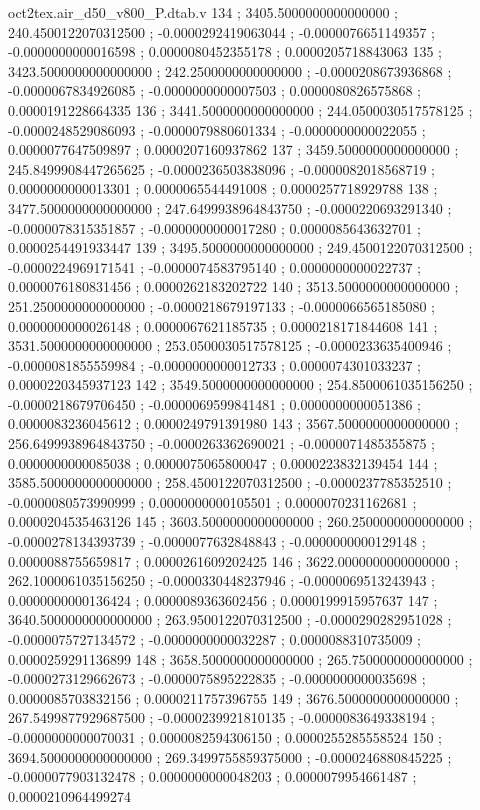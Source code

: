 \begin{filecontents}[overwrite]{oct2tex.air_d50_v800_P.dtab.v}
134 ; 3405.5000000000000000 ; 240.4500122070312500 ; -0.0000292419063044 ; -0.0000076651149357 ; -0.0000000000016598 ; 0.0000080452355178 ; 0.0000205718843063
135 ; 3423.5000000000000000 ; 242.2500000000000000 ; -0.0000208673936868 ; -0.0000067834926085 ; -0.0000000000007503 ; 0.0000080826575868 ; 0.0000191228664335
136 ; 3441.5000000000000000 ; 244.0500030517578125 ; -0.0000248529086093 ; -0.0000079880601334 ; -0.0000000000022055 ; 0.0000077647509897 ; 0.0000207160937862
137 ; 3459.5000000000000000 ; 245.8499908447265625 ; -0.0000236503838096 ; -0.0000082018568719 ; 0.0000000000013301 ; 0.0000065544491008 ; 0.0000257718929788
138 ; 3477.5000000000000000 ; 247.6499938964843750 ; -0.0000220693291340 ; -0.0000078315351857 ; -0.0000000000017280 ; 0.0000085643632701 ; 0.0000254491933447
139 ; 3495.5000000000000000 ; 249.4500122070312500 ; -0.0000224969171541 ; -0.0000074583795140 ; 0.0000000000022737 ; 0.0000076180831456 ; 0.0000262183202722
140 ; 3513.5000000000000000 ; 251.2500000000000000 ; -0.0000218679197133 ; -0.0000066565185080 ; 0.0000000000026148 ; 0.0000067621185735 ; 0.0000218171844608
141 ; 3531.5000000000000000 ; 253.0500030517578125 ; -0.0000233635400946 ; -0.0000081855559984 ; -0.0000000000012733 ; 0.0000074301033237 ; 0.0000220345937123
142 ; 3549.5000000000000000 ; 254.8500061035156250 ; -0.0000218679706450 ; -0.0000069599841481 ; 0.0000000000051386 ; 0.0000083236045612 ; 0.0000249791391980
143 ; 3567.5000000000000000 ; 256.6499938964843750 ; -0.0000263362690021 ; -0.0000071485355875 ; 0.0000000000085038 ; 0.0000075065800047 ; 0.0000223832139454
144 ; 3585.5000000000000000 ; 258.4500122070312500 ; -0.0000237785352510 ; -0.0000080573990999 ; 0.0000000000105501 ; 0.0000070231162681 ; 0.0000204535463126
145 ; 3603.5000000000000000 ; 260.2500000000000000 ; -0.0000278134393739 ; -0.0000077632848843 ; -0.0000000000129148 ; 0.0000088755659817 ; 0.0000261609202425
146 ; 3622.0000000000000000 ; 262.1000061035156250 ; -0.0000330448237946 ; -0.0000069513243943 ; 0.0000000000136424 ; 0.0000089363602456 ; 0.0000199915957637
147 ; 3640.5000000000000000 ; 263.9500122070312500 ; -0.0000290282951028 ; -0.0000075727134572 ; -0.0000000000032287 ; 0.0000088310735009 ; 0.0000259291136899
148 ; 3658.5000000000000000 ; 265.7500000000000000 ; -0.0000273129662673 ; -0.0000075895222835 ; -0.0000000000035698 ; 0.0000085703832156 ; 0.0000211757396755
149 ; 3676.5000000000000000 ; 267.5499877929687500 ; -0.0000239921810135 ; -0.0000083649338194 ; -0.0000000000070031 ; 0.0000082594306150 ; 0.0000255285558524
150 ; 3694.5000000000000000 ; 269.3499755859375000 ; -0.0000246880845225 ; -0.0000077903132478 ; 0.0000000000048203 ; 0.0000079954661487 ; 0.0000210964499274

\end{filecontents}
